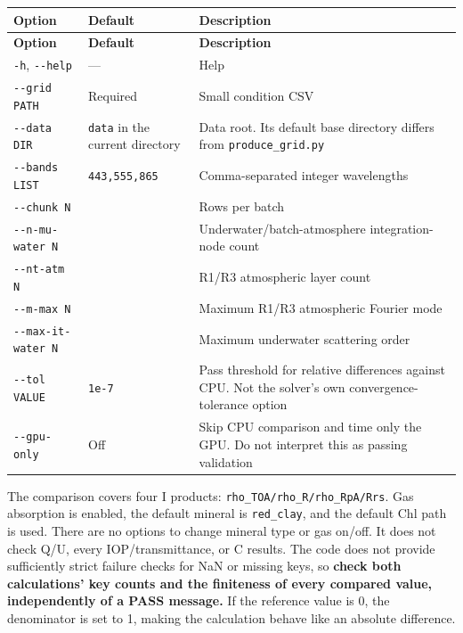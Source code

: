 {\TableFont
\begin{longtable}{@{}>{\raggedright\arraybackslash}p{}>{\raggedright\arraybackslash}p{}>{\raggedright\arraybackslash}p{}@{}}
\toprule
\textbf{Option} & \textbf{Default} & \textbf{Description} \\
\midrule
\endfirsthead
\toprule
\textbf{Option} & \textbf{Default} & \textbf{Description} \\
\midrule
\endhead
\bottomrule
\endfoot
\texttt{-\allowbreak{}h}, \texttt{-\allowbreak{}-\allowbreak{}help} & --- & Help \\
\texttt{-\allowbreak{}-\allowbreak{}grid PATH} & Required & Small condition CSV \\
\texttt{-\allowbreak{}-\allowbreak{}data DIR} & \texttt{data} in the current directory & Data root. Its default base directory differs from \texttt{produce\_\allowbreak{}grid.\allowbreak{}py} \\
\texttt{-\allowbreak{}-\allowbreak{}bands LIST} & \texttt{443,\allowbreak{}555,\allowbreak{}865} & Comma-separated integer wavelengths \\
\texttt{-\allowbreak{}-\allowbreak{}chunk N} & 8 & Rows per batch \\
\texttt{-\allowbreak{}-\allowbreak{}n-\allowbreak{}mu-\allowbreak{}water N} & 24 & Underwater/batch-atmosphere integration-node count \\
\texttt{-\allowbreak{}-\allowbreak{}nt-\allowbreak{}atm N} & 400 & R1/R3 atmospheric layer count \\
\texttt{-\allowbreak{}-\allowbreak{}m-\allowbreak{}max N} & 16 & Maximum R1/R3 atmospheric Fourier mode \\
\texttt{-\allowbreak{}-\allowbreak{}max-\allowbreak{}it-\allowbreak{}water N} & 500 & Maximum underwater scattering order \\
\texttt{-\allowbreak{}-\allowbreak{}tol VALUE} & \texttt{1e-\allowbreak{}7} & Pass threshold for relative differences against CPU. Not the solver's own convergence-tolerance option \\
\texttt{-\allowbreak{}-\allowbreak{}gpu-\allowbreak{}only} & Off & Skip CPU comparison and time only the GPU. Do not interpret this as passing validation \\
\end{longtable}
}

The comparison covers four I products: \texttt{rho\_\allowbreak{}TOA/\allowbreak{}rho\_\allowbreak{}R/\allowbreak{}rho\_\allowbreak{}RpA/\allowbreak{}Rrs}. Gas absorption is enabled, the default mineral is \texttt{red\_\allowbreak{}clay}, and the default Chl path is used. There are no options to change mineral type or gas on/off. It does not check Q/U, every IOP/transmittance, or C results. The code does not provide sufficiently strict failure checks for NaN or missing keys, so \textbf{check both calculations' key counts and the finiteness of every compared value, independently of a PASS message.} If the reference value is 0, the denominator is set to 1, making the calculation behave like an absolute difference.

